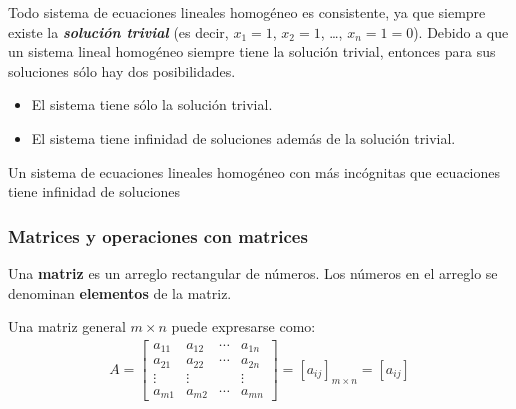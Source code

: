 \documentclass[a4paper,12pt]{article}
\begin{document}
Todo sistema de ecuaciones lineales homogéneo es consistente, ya que siempre
existe la \textbf{\textit{solución trivial}} (es decir, $x_1=1$, $x_2=1$,
\ldots, $x_n=1=0$).
Debido a que un sistema lineal homogéneo siempre tiene la solución trivial,
entonces para sus soluciones sólo hay dos posibilidades.

\begin{concept}
  \begin{itemize}
    \item El sistema tiene sólo la solución trivial.
    \item El sistema tiene infinidad de soluciones además de la solución
      trivial.
  \end{itemize}
\end{concept}

\begin{theorem}
  Un sistema de ecuaciones lineales homogéneo con más incógnitas que
  ecuaciones tiene infinidad de soluciones
  \label{theo:1}
\end{theorem}

\subsubsection{Matrices y operaciones con matrices}

\begin{concept}[i]
  Una \textbf{matriz} es un arreglo rectangular de números. Los números en el arreglo
  se denominan \textbf{elementos} de la matriz.
\end{concept}

Una matriz general $m\times n$ puede expresarse como:
\begin{align*}
  A = \begin{bmatrix}
    a_{11}& a_{12}& \cdots& a_{1n}\\
    a_{21}& a_{22}& \cdots& a_{2n}\\
    \vdots&\vdots &       &\vdots \\
    a_{m1}& a_{m2}& \cdots& a_{mn}
  \end{bmatrix}
  = \left[ a_{ij} \right]_{m\times n} = \left[ a_{ij} \right]
\end{align*}
\end{document}

